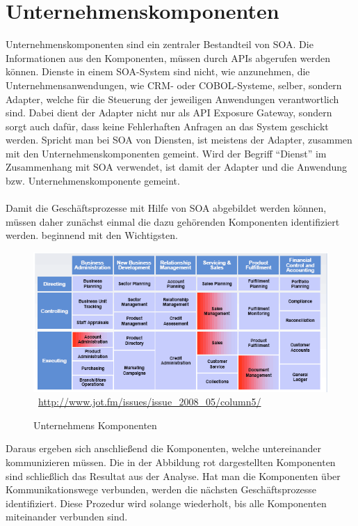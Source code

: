 \section{Unternehmenskomponenten}
\label{sec:UnternehmensKomponenten}
Unternehmenskomponenten sind ein zentraler Bestandteil von SOA. Die Informationen aus den Komponenten, müssen durch APIs abgerufen werden können. Dienste in einem SOA-System sind nicht, wie anzunehmen, die Unternehmensanwendungen, wie CRM- oder COBOL-Systeme, selber, sondern Adapter, welche für die Steuerung der jeweiligen Anwendungen verantwortlich sind. Dabei dient der Adapter nicht nur als API Exposure Gateway, sondern sorgt auch dafür, dass keine Fehlerhaften Anfragen an das System geschickt werden. Spricht man bei SOA von Diensten, ist meistens der Adapter, zusammen mit den Unternehmenskomponenten gemeint. Wird der Begriff "`Dienst"' im Zusammenhang mit SOA verwendet, ist damit der Adapter und die Anwendung bzw. Unternehmenskomponente gemeint.
\\\\
Damit die Geschäftsprozesse mit Hilfe von SOA abgebildet werden können, müssen daher zunächst einmal die dazu gehörenden Komponenten identifiziert werden. beginnend mit den Wichtigsten.

\begin{figure}[htb]
    \centering 
    \includegraphics[width=\linewidth]{content/images/UnternehmensKomponenten}\
    \quelle\url{http://www.jot.fm/issues/issue_2008_05/column5/}
    \caption[Unternehmens Komponenten]{Unternehmens Komponenten\\}
    \label{fig:UnternehmensKomponenten}  
\end{figure} 
\newpage
Daraus ergeben sich anschließend die Komponenten, welche untereinander kommunizieren müssen. Die in der Abbildung rot dargestellten Komponenten sind schließlich das Resultat aus der Analyse. Hat man die Komponenten über Kommunikationswege verbunden, werden die nächsten Geschäftsprozesse identifiziert. Diese Prozedur wird solange wiederholt, bis alle Komponenten miteinander verbunden sind.

